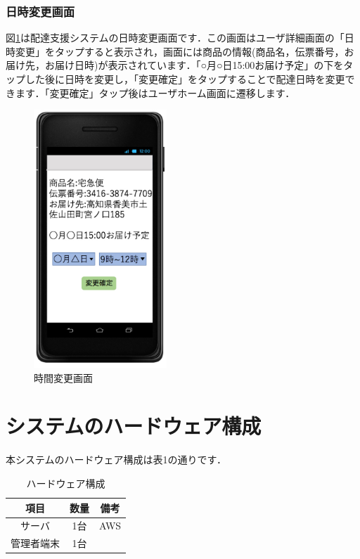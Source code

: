 \documentclass[a4j,titlepage]{jarticle}
\begin{document}
\subsubsection{日時変更画面}
図\ref{fig:time_change}は配達支援システムの日時変更画面です．この画面はユーザ詳細画面の「日時変更」をタップすると表示され，画面には商品の情報(商品名，伝票番号，お届け先，お届け日時)が表示されています．「○月○日15:00お届け予定」の下をタップした後に日時を変更し，「変更確定」をタップすることで配達日時を変更できます．「変更確定」タップ後はユーザホーム画面に遷移します．

\begin{figure}[htbp]
 \begin{center}
  \includegraphics[width=50mm]{time_change}
	\caption{時間変更画面}
	\label{fig:time_change}
 \end{center}

\end{figure}

\section{システムのハードウェア構成}
本システムのハードウェア構成は表1の通りです．
\begin{table}[htbp]
\begin{center}
 \caption{ハードウェア構成}
  \begin{tabular}{|c|c|c|}\hline
    項目 & 数量 & 備考\\ \hline \hline
    サーバ & 1台 & AWS\\ \hline
    管理者端末 & 1台 & \\ \hline
  \end{tabular}
\end{center}
\end{table}
\end{document}
